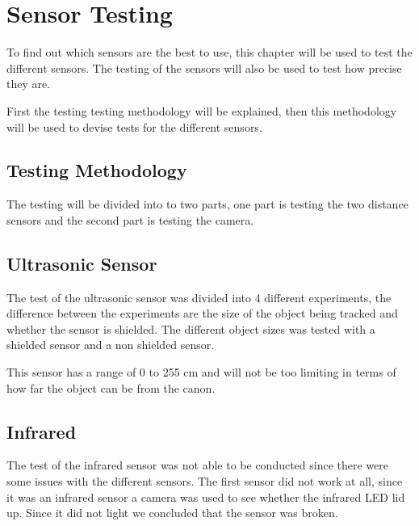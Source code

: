 \section{Sensor Testing}
To find out which sensors are the best to use, this chapter will be used to test
the different sensors. The testing of the sensors will also be used to test how
precise they are.\nl

First the testing testing methodology will be explained, then this methodology
will be used to devise tests for the different sensors. 

\subsection{Testing Methodology}
The testing will be divided into to two parts, one part is testing the two
distance sensors and the second part is testing the camera. 

\subsection{Ultrasonic Sensor}
The test of the ultrasonic sensor was divided into 4 different experiments, the
difference between the experiments are the size of the object being tracked and
whether the sensor is shielded. The different object sizes was tested with a
shielded sensor and a non shielded sensor. \nl


This sensor has a range of 0 to 255 cm and will not be too limiting in terms of
how far the object can be from the canon. 

\subsection{Infrared}
The test of the infrared sensor was not able to be conducted since there were
some issues with the different sensors. The first sensor did not work at all,
since it was an infrared sensor a camera was used to see whether the infrared
LED lid up. Since it did not light we concluded that the sensor was broken. \nl

